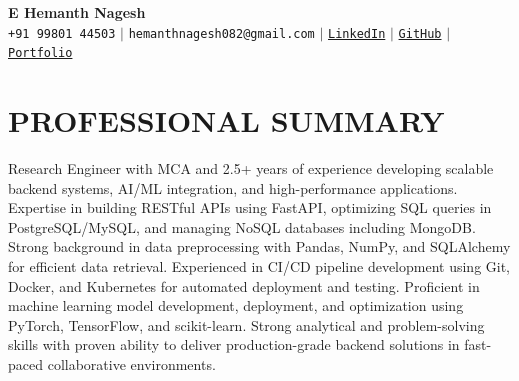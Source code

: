 \documentclass[letterpaper,10pt]{article}
\begin{document}
\begin{center}
    \textbf{\Huge E Hemanth Nagesh} \\ \vspace{5pt}
    \small 
    \faPhone* \texttt{+91 99801 44503} \hspace{1pt} $|$     \hspace{1pt} \faEnvelope \hspace{2pt} \texttt{hemanthnagesh082@gmail.com} \hspace{1pt} $|$ 
    \hspace{1pt} \faLinkedin \hspace{2pt} \href{https://linkedin.com/in/e-hemanth-nagesh}{\texttt{LinkedIn}} $|$
    \faGithub \hspace{2pt} \href{https://github.com/hemanth-nagesh}{\texttt{GitHub}} \hspace{1pt} $|$     \hspace{1pt} \faGlobe \hspace{2pt} \href{https://portfolio-ehn.netlify.app/}{\texttt{Portfolio}}
    \\ \vspace{-3pt}
\end{center}

\section{PROFESSIONAL SUMMARY}
\small
Research Engineer with MCA and 2.5+ years of experience developing scalable backend systems, AI/ML integration, and high-performance applications. Expertise in building RESTful APIs using FastAPI, optimizing SQL queries in PostgreSQL/MySQL, and managing NoSQL databases including MongoDB. Strong background in data preprocessing with Pandas, NumPy, and SQLAlchemy for efficient data retrieval. Experienced in CI/CD pipeline development using Git, Docker, and Kubernetes for automated deployment and testing. Proficient in machine learning model development, deployment, and optimization using PyTorch, TensorFlow, and scikit-learn. Strong analytical and problem-solving skills with proven ability to deliver production-grade backend solutions in fast-paced collaborative environments.
\vspace{-6pt}

\end{document}
